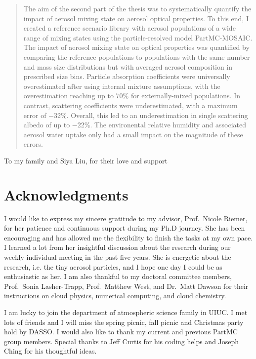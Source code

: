 \documentclass[edeposit,fullpage]{uiucthesis2009}
\begin{document}
\begin{abstract}
The aim of the second part of the thesis was to systematically
quantify the impact of aerosol mixing state on aerosol optical
properties. To this end, I created a reference scenario library with
aerosol populations of a wide range of mixing states using the
particle-resolved model PartMC-MOSAIC. The impact of aerosol mixing
state on optical properties was quantified by comparing the reference
populations to populations with the same number and mass size
distributions but with averaged aerosol composition in prescribed size
bins. Particle absorption coefficients were universally overestimated
after using internal mixture assumptions, with the overestimation
reaching up to 70\% for externally-mixed populations. In contrast,
scattering coefficients were underestimated, with a maximum error of
$-$32\%. Overall, this led to an underestimation in single scattering
albedo of up to $-$22\%. The environental relative humidity and
associated aerosol water uptake only had a small impact on the
magnitude of these errors.

\end{abstract}

\begin{dedication}
To my family and Siya Liu, for their love and support
\end{dedication}

\chapter*{Acknowledgments}
I would like to express my sincere gratitude to my advisor, Prof.\ Nicole Riemer, 
for her patience and continuous support during my Ph.D journey. She has been encouraging and has allowed me the flexibility to finish the tasks at my  own pace. I learned a lot from her insightful discussion about the research during our weekly individual meeting in the past five years. She is energetic about the research, i.e. the tiny aerosol particles, and I hope one day I could be as enthusiastic as her. I am also thankful to my doctoral committee members, Prof.\ Sonia Lasher-Trapp, Prof.\ Matthew West, and Dr.\ Matt Dawson for their instructions on cloud physics, numerical computing, and cloud chemistry.  

I am lucky to join the department of atmospheric science family in UIUC. I met lots of friends and I will miss the spring picnic, fall picnic and Christmas party hold by DASSO. I would also like to thank my current and previous PartMC group members. Special thanks to Jeff Curtis for his coding helps and Joseph Ching for his thoughtful ideas. 
\end{document}
